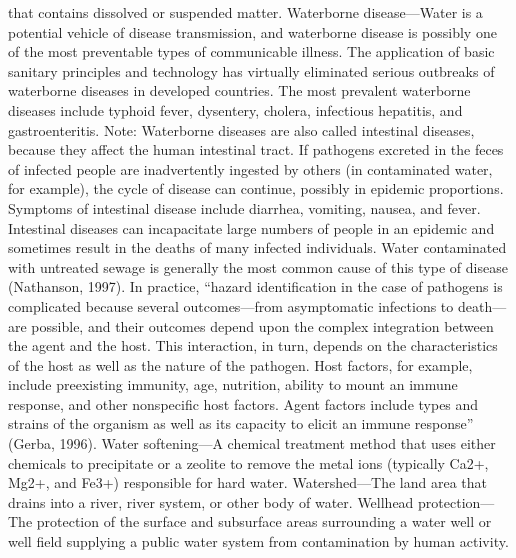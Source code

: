 \documentclass{article}
\begin{document}
that contains dissolved or suspended matter. Waterborne disease---Water
is a potential vehicle of disease transmission, and waterborne disease
is possibly one of the most preventable types of communicable illness.
The application of basic sanitary principles and technology has
virtually eliminated serious outbreaks of waterborne diseases in
developed countries. The most prevalent waterborne diseases include
typhoid fever, dysentery, cholera, infectious hepatitis, and
gastroenteritis. Note: Waterborne diseases are also called intestinal
diseases, because they affect the human intestinal tract. If pathogens
excreted in the feces of infected people are inadvertently ingested by
others (in contaminated water, for example), the cycle of disease can
continue, possibly in epidemic proportions. Symptoms of intestinal
disease include diarrhea, vomiting, nausea, and fever. Intestinal
diseases can incapacitate large numbers of people in an epidemic and
sometimes result in the deaths of many infected individuals. Water
contaminated with untreated sewage is generally the most common cause of
this type of disease (Nathanson, 1997). In practice, ``hazard
identification in the case of pathogens is complicated because several
outcomes---from asymptomatic infections to death---are possible, and
their outcomes depend upon the complex integration between the agent and
the host. This interaction, in turn, depends on the characteristics of
the host as well as the nature of the pathogen. Host factors, for
example, include preexisting immunity, age, nutrition, ability to mount
an immune response, and other nonspecific host factors. Agent factors
include types and strains of the organism as well as its capacity to
elicit an immune response'' (Gerba, 1996). Water softening---A chemical
treatment method that uses either chemicals to precipitate or a zeolite
to remove the metal ions (typically Ca2+, Mg2+, and Fe3+) responsible
for hard water. Watershed---The land area that drains into a river,
river system, or other body of water. Wellhead protection---The
protection of the surface and subsurface areas surrounding a water well
or well field supplying a public water system from contamination by
human activity.
\end{document}
